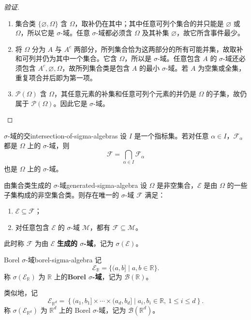 \begin{proof}[验证]
\begin{enumerate}
\item 集合类 $\{\varnothing,\Omega\}$ 含 $\Omega$，取补仍在其中；其中任意可列个集合的并只能是 $\varnothing$ 或 $\Omega$，所以它是 $\sigma$-域。任意 $\sigma$-域都必须含 $\Omega$ 及其补集 $\varnothing$，故它所含事件最少。
\item 将 $\Omega$ 分为 $A$ 与 $A^c$ 两部分，所列集合恰为这两部分的所有可能并集，故取补和可列并仍为其中一个集合。它含 $\Omega$，所以是 $\sigma$-域。任意包含 $A$ 的 $\sigma$-域还必须包含 $A^c,\varnothing,\Omega$，故所列集合类是包含 $A$ 的最小 $\sigma$-域。若 $A$ 为空集或全集，重复项合并后即为第一项。
\item $\mathcal P(\Omega)$ 含 $\Omega$，其任意元素的补集和任意可列个元素的并仍是 $\Omega$ 的子集，故仍属于 $\mathcal P(\Omega)$。因此它是 $\sigma$-域。
\end{enumerate}
\end{proof}

\begin{proposition}{$\sigma$-域的交}{intersection-of-sigma-algebras}
设 $I$ 是一个指标集。若对任意 $\alpha\in I$，$\mathscr{F}_\alpha$ 都是 $\Omega$ 上的 $\sigma$-域，则
\[
\mathscr{F}=\bigcap_{\alpha\in I}\mathscr{F}_\alpha
\]
也是 $\Omega$ 上的 $\sigma$-域。
\end{proposition}

\begin{mytheorem}{由集合类生成的 $\sigma$-域}{generated-sigma-algebra}
设 $\Omega$ 是非空集合，$\mathscr{E}$ 是由 $\Omega$ 的一些子集构成的非空集合类。则存在唯一的 $\sigma$-域 $\mathscr{F}$ 满足：
\begin{enumerate}
\item $\mathscr{E}\subseteq\mathscr{F}$；
\item 对任意包含 $\mathscr{E}$ 的 $\sigma$-域 $\mathcal{M}$，都有 $\mathscr{F}\subseteq\mathcal{M}$。
\end{enumerate}
此时称 $\mathscr{F}$ 为由 $\mathscr{E}$ \textbf{生成的 $\sigma$-域}，记为 $\sigma(\mathscr{E})$。
\end{mytheorem}

\begin{mydefinition}{Borel $\sigma$-域}{borel-sigma-algebra}
记
\[
\mathscr{E}_{\mathbb{R}}=\{(a,b]\mid a,b\in\mathbb{R}\}.
\]
称 $\sigma(\mathscr{E}_{\mathbb{R}})$ 为 $\mathbb{R}$ 上的\textbf{Borel $\sigma$-域}，记为 $\mathscr{B}(\mathbb{R})$。

类似地，记
\[
\mathscr{E}_{\mathbb{R}^d}
=\left\{(a_1,b_1]\times\cdots\times(a_d,b_d]\mid a_i,b_i\in\mathbb{R},\ 1\leq i\leq d\right\}.
\]
称 $\sigma(\mathscr{E}_{\mathbb{R}^d})$ 为 $\mathbb{R}^d$ 上的 Borel $\sigma$-域，记为 $\mathscr{B}(\mathbb{R}^d)$。
\end{mydefinition}

